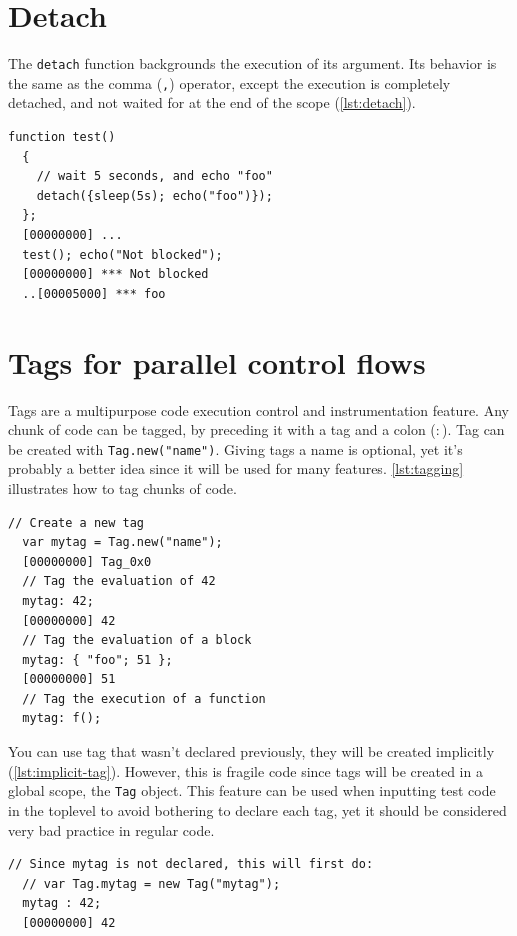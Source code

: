 \documentclass[openright,twoside,12pt]{report}
\newcommand{\lst}[1]{\autoref{lst:#1}}
\begin{document}
\section{Detach}

The \texttt{detach} function backgrounds the execution of its
argument. Its behavior is the same as the comma (\texttt{,}) operator,
except the execution is completely detached, and not waited for at the
end of the scope (\lst{detach}).

\begin{lstlisting}[caption=Detach, label=lst:detach]
  function test()
  {
    // wait 5 seconds, and echo "foo"
    detach({sleep(5s); echo("foo")});
  };
  [00000000] ...
  test(); echo("Not blocked");
  [00000000] *** Not blocked
  ..[00005000] *** foo
\end{lstlisting}

\section{Tags for parallel control flows}

Tags are a multipurpose code execution control and instrumentation
feature. Any chunk of code can be tagged, by preceding it with a tag
and a colon (\texttt{$:$}). Tag can be created with
\lstinline|Tag.new("name")|. Giving tags a name is optional, yet it's
probably a better idea since it will be used for many
features. \lst{tagging} illustrates how to tag chunks of code.

\begin{lstlisting}[caption=Tagging a block of code, label=lst:tagging]
  // Create a new tag
  var mytag = Tag.new("name");
  [00000000] Tag_0x0
  // Tag the evaluation of 42
  mytag: 42;
  [00000000] 42
  // Tag the evaluation of a block
  mytag: { "foo"; 51 };
  [00000000] 51
  // Tag the execution of a function
  mytag: f();
\end{lstlisting}

You can use tag that wasn't declared previously, they will be created
implicitly (\lst{implicit-tag}). However, this is fragile code since
tags will be created in a global scope, the \texttt{Tag} object. This
feature can be used when inputting test code in the toplevel to avoid
bothering to declare each tag, yet it should be considered very bad
practice in regular code.

\begin{lstlisting}[caption=Tag created implicitly,
  label=lst:implicit-tag]
  // Since mytag is not declared, this will first do:
  // var Tag.mytag = new Tag("mytag");
  mytag : 42;
  [00000000] 42
\end{lstlisting}
\end{document}
